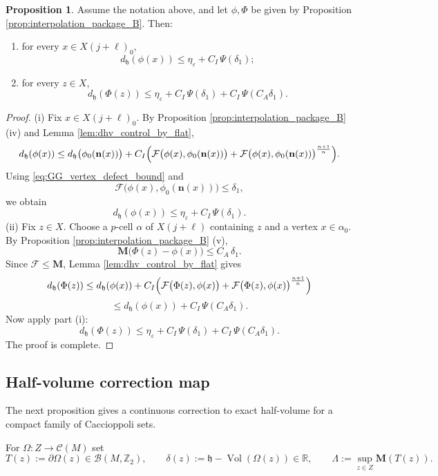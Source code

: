 \documentclass[12pt,english]{article}
\theoremstyle{definition}
\newtheorem{proposition}[theorem]{Proposition}
\begin{document}
\begin{proposition}\label{prop:defect_after_interpolation}
Assume the notation above, and let $\phi,\Phi$ be given by Proposition
\ref{prop:interpolation_package_B}. Then:
\begin{enumerate}
\item[(i)] for every $x\in X(j+\ell)_0$,
\[
d_{\mathfrak h}(\phi(x))
\le \eta_\varepsilon + C_I\,\Psi(\delta_1);
\]
\item[(ii)] for every $z\in X$,
\[
d_{\mathfrak h}(\Phi(z))
\le \eta_\varepsilon + C_I\,\Psi(\delta_1)+ C_I\,\Psi(C_A\delta_1).
\]
\end{enumerate}
\end{proposition}

\begin{proof}
(i) Fix $x\in X(j+\ell)_0$. By Proposition \ref{prop:interpolation_package_B} (iv) and Lemma \ref{lem:dhv_control_by_flat},
\[
d_{\mathfrak h}(\phi(x))
\le d_{\mathfrak h}\bigl(\phi_0(\mathbf n(x))\bigr)
   + C_I\Bigl(\mathcal F\bigl(\phi(x),\phi_0(\mathbf n(x))\bigr)
   + \mathcal F\bigl(\phi(x),\phi_0(\mathbf n(x))\bigr)^{\frac{n+1}{n}}\Bigr).
\]
Using \eqref{eq:GG_vertex_defect_bound} and
\[
\mathcal F\bigl(\phi(x),\phi_0(\mathbf n(x))\bigr)\le \delta_1,
\]
we obtain
\[
d_{\mathfrak h}(\phi(x))\le \eta_\varepsilon + C_I\,\Psi(\delta_1).
\]
(ii) Fix $z\in X$. Choose a $p$-cell $\alpha$ of $X(j+\ell)$ containing $z$ and a vertex
$x\in \alpha_0$. By Proposition \ref{prop:interpolation_package_B} (v),
\[
\mathbf M\bigl(\Phi(z)-\phi(x)\bigr)\le C_A\,\delta_1.
\]
Since $\mathcal F\le \mathbf M$, Lemma \ref{lem:dhv_control_by_flat} gives
\[
d_{\mathfrak h}(\Phi(z))
\le d_{\mathfrak h}(\phi(x))
   + C_I\Bigl(\mathcal F\bigl(\Phi(z),\phi(x)\bigr)
   + \mathcal F\bigl(\Phi(z),\phi(x)\bigr)^{\frac{n+1}{n}}\Bigr)
\]
\[
\le d_{\mathfrak h}(\phi(x)) + C_I\,\Psi(C_A\delta_1).
\]
Now apply part (i):
\[
d_{\mathfrak h}(\Phi(z))
\le \eta_\varepsilon + C_I\,\Psi(\delta_1)+ C_I\,\Psi(C_A\delta_1).
\]
The proof is complete.
\end{proof}

\subsection{Half-volume correction map}

The next proposition gives a continuous correction to exact half-volume for a compact family of Caccioppoli sets.

For $\Omega:Z\to\mathcal C(M)$ set
\[
T(z):=\partial\Omega(z)\in \mathcal B(M,\mathbb{Z}_2),
\qquad
\delta(z):=\mathfrak h-\operatorname{Vol}(\Omega(z))\in\mathbb{R},
\qquad
\Lambda:=\sup_{z\in Z}\mathbf M(T(z)).
\]
\end{document}
